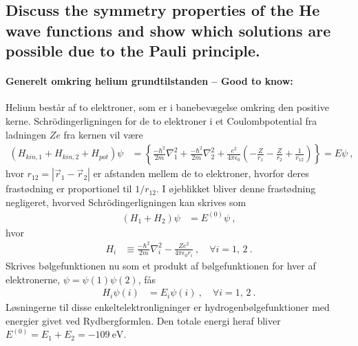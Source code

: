 \subsection{Discuss the symmetry properties of the He wave functions and show which solutions are possible due to the Pauli principle.}


\paragraph{Generelt omkring helium grundtilstanden -- Good to know:} Helium består af to elektroner, som er i banebevægelse omkring den positive kerne. Schrödingerligningen for de to elektroner i et Coulombpotential fra ladningen $Ze$ fra kernen vil være
\begin{align}
    \left(H_{kin,1} + H_{kin,2} + H_{pot}\right)\psi &= \left\{\frac{-\hbar^2}{2m}\nabla_1^2 + \frac{-\hbar^2}{2m}\nabla_2^2 + \frac{e^2}{4\pi\epsilon_0} \left(-\frac{Z}{r_1} - \frac{Z}{r_2} + \frac{1}{r_{12}}\right)\right\} = E\psi \: ,
\end{align}
hvor $r_{12} = |\Vec{r}_1 - \Vec{r}_2|$ er afstanden mellem de to elektroner, hvorfor deres frastødning er proportionel til $1/r_{12}$. I øjeblikket bliver denne frastødning negligeret, hvorved Schrödingerligningen kan skrives som
\begin{align}
    \left(H_1 + H_2\right)\psi &= E^{(0)}\psi \: ,
\end{align}
hvor
\begin{align}
    H_i &\equiv \frac{-\hbar^2}{2m}\nabla_i^2 - \frac{Ze^2}{4\pi\epsilon_0 r_i} \: , \quad \forall i = 1,\,2 \: .
\end{align}
Skrives bølgefunktionen nu som et produkt af bølgefunktionen for hver af elektronerne, $\psi = \psi(1)\psi(2)$, fås
\begin{align}
    H_i\psi(i) &= E_i\psi(i) \: , \quad \forall i = 1,\,2 \: .
\end{align}
Løsningerne til disse enkeltelektronligninger er hydrogenbølgefunktioner med energier givet ved Rydbergformlen. Den totale energi heraf bliver $E^{(0)} = E_1 + E_2 = \SI{-109}{\eV}$.\\

